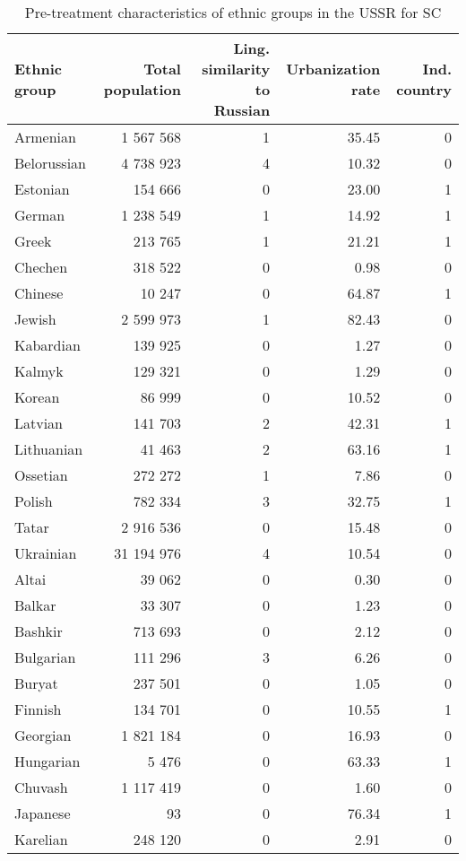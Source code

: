 \begin{table}[t]

\caption{\label{tab:sc_predictors}Pre-treatment characteristics of ethnic groups in the USSR for SC}
\centering
\begin{threeparttable}
\begin{tabular}{lrrrr}
\toprule
Ethnic group & Total population & Ling. similarity to Russian & Urbanization rate & Ind. country\\
\midrule
Armenian & 1 567 568 & 1 & 35.45 & 0\\
Belorussian & 4 738 923 & 4 & 10.32 & 0\\
Estonian & 154 666 & 0 & 23.00 & 1\\
German & 1 238 549 & 1 & 14.92 & 1\\
Greek & 213 765 & 1 & 21.21 & 1\\
Chechen & 318 522 & 0 & 0.98 & 0\\
Chinese & 10 247 & 0 & 64.87 & 1\\
Jewish & 2 599 973 & 1 & 82.43 & 0\\
Kabardian & 139 925 & 0 & 1.27 & 0\\
Kalmyk & 129 321 & 0 & 1.29 & 0\\
Korean & 86 999 & 0 & 10.52 & 0\\
Latvian & 141 703 & 2 & 42.31 & 1\\
Lithuanian & 41 463 & 2 & 63.16 & 1\\
Ossetian & 272 272 & 1 & 7.86 & 0\\
Polish & 782 334 & 3 & 32.75 & 1\\
Tatar & 2 916 536 & 0 & 15.48 & 0\\
Ukrainian & 31 194 976 & 4 & 10.54 & 0\\
Altai & 39 062 & 0 & 0.30 & 0\\
Balkar & 33 307 & 0 & 1.23 & 0\\
Bashkir & 713 693 & 0 & 2.12 & 0\\
Bulgarian & 111 296 & 3 & 6.26 & 0\\
Buryat & 237 501 & 0 & 1.05 & 0\\
Finnish & 134 701 & 0 & 10.55 & 1\\
Georgian & 1 821 184 & 0 & 16.93 & 0\\
Hungarian & 5 476 & 0 & 63.33 & 1\\
Chuvash & 1 117 419 & 0 & 1.60 & 0\\
Japanese & 93 & 0 & 76.34 & 1\\
Karelian & 248 120 & 0 & 2.91 & 0\\

\end{tabular}
\end{threeparttable}
\end{table}
